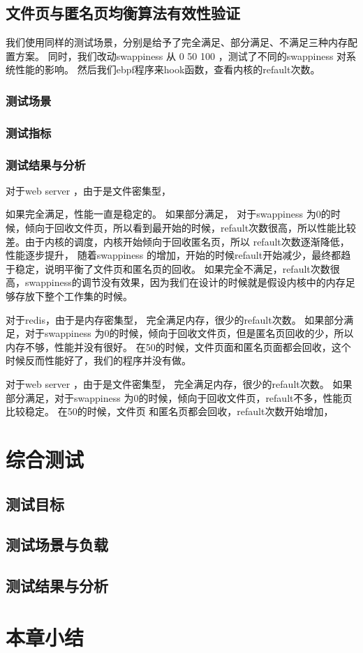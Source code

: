 \subsection{文件页与匿名页均衡算法有效性验证}

    我们使用同样的测试场景，分别是给予了完全满足、部分满足、不满足三种内存配置方案。
    同时，我们改动swappiness 从 0 50 100 ，测试了不同的swappiness 对系统性能的影响。
    然后我们ebpf程序来hook函数，查看内核的refault次数。
    \subsubsection{测试场景}
    \subsubsection{测试指标}
    \subsubsection{测试结果与分析}

    对于web server ，由于是文件密集型，
    
    如果完全满足，性能一直是稳定的。
    如果部分满足， 对于swappiness 为0的时候，倾向于回收文件页，所以看到最开始的时候，refault次数很高，所以性能比较差。由于内核的调度，内核开始倾向于回收匿名页，所以 refault次数逐渐降低，性能逐步提升，
    随着swappiness 的增加，开始的时候refault开始减少，最终都趋于稳定，说明平衡了文件页和匿名页的回收。
    如果完全不满足，refault次数很高，swappiness的调节没有效果，因为我们在设计的时候就是假设内核中的内存足够存放下整个工作集的时候。

    对于redis，由于是内存密集型，
    完全满足内存，很少的refault次数。
    如果部分满足，对于swappiness 为0的时候，倾向于回收文件页，但是匿名页回收的少，所以内存不够，性能并没有很好。
    在50的时候，文件页面和匿名页面都会回收，这个时候反而性能好了，我们的程序并没有做。


    对于web server ，由于是文件密集型，
    完全满足内存，很少的refault次数。
    如果部分满足，对于swappiness 为0的时候，倾向于回收文件页，refault不多，性能页比较稳定。
    在50的时候，文件页 和匿名页都会回收，refault次数开始增加，

\section{综合测试}
\subsection{测试目标}
\subsection{测试场景与负载}
\subsection{测试结果与分析}

\section{本章小结}
